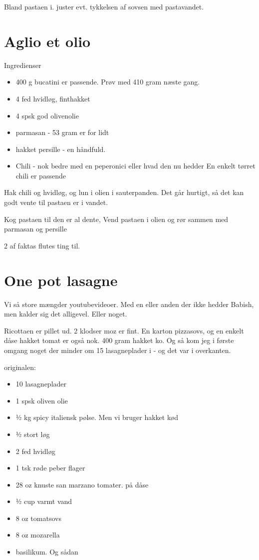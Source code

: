 \documentclass[
  letterpaper,
  DIV=11,
  numbers=noendperiod]{scrreprt}
\providecommand{\tightlist}{%
  \setlength{\itemsep}{0pt}\setlength{\parskip}{0pt}}\usepackage{longtable,booktabs,array}
\begin{document}
Bland pastaen i. juster evt. tykkelsen af sovsen med pastavandet.

\hypertarget{aglio-et-olio}{%
\section{Aglio et olio}\label{aglio-et-olio}}

Ingredienser

\begin{itemize}
\tightlist
\item
  400 g bucatini er passende. Prøv med 410 gram næste gang.
\item
  4 fed hvidløg, finthakket
\item
  4 spsk god olivenolie
\item
  parmasan - 53 gram er for lidt
\item
  hakket persille - en håndfuld.
\item
  Chili - nok bedre med en peperonici eller hvad den nu hedder En enkelt
  tørret chili er passende
\end{itemize}

Hak chili og hvidløg, og lun i olien i sauterpanden. Det går hurtigt, så
det kan godt vente til pastaen er i vandet.

Kog pastaen til den er al dente, Vend pastaen i olien og rør sammen med
parmasan og persille

2 af faktas flutes ting til.

\hypertarget{one-pot-lasagne}{%
\section{One pot lasagne}\label{one-pot-lasagne}}

Vi så store mængder youtubevideoer. Med en eller anden der ikke hedder
Babish, men kalder sig det alligevel. Eller noget.

Ricottaen er pillet ud. 2 klodser moz er fint. En karton pizzasovs, og
en enkelt dåse hakket tomat er også nok. 400 gram hakket ko. Og så kom
jeg i første omgang noget der minder om 15 lasagneplader i - og det var
i overkanten.

originalen:

\begin{itemize}
\tightlist
\item
  10 lasagneplader
\item
  1 spsk oliven olie
\item
  ½ kg spicy italiensk pølse. Men vi bruger hakket kød
\item
  ½ stort løg
\item
  2 fed hvidløg
\item
  1 tsk røde peber flager
\item
  28 oz knuste san marzano tomater. på dåse
\item
  ½ cup varmt vand
\item
  8 oz tomatsovs
\item
  8 oz mozarella
\item
  basilikum. Og sådan
\end{itemize}
\end{document}
